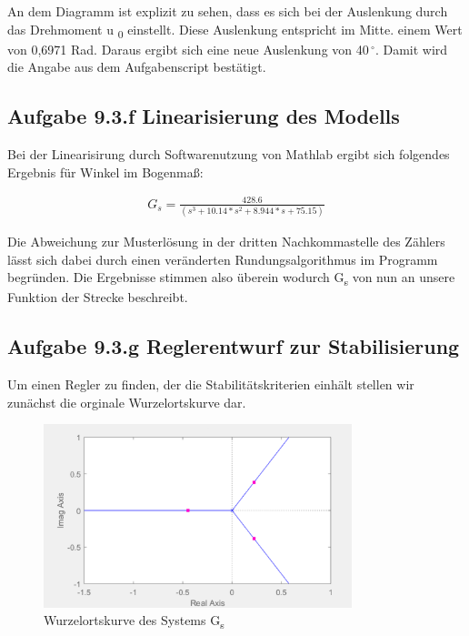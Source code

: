 \documentclass[10pt]{scrartcl}
\begin{document}
An dem Diagramm ist explizit zu sehen, dass es sich bei der Auslenkung durch das Drehmoment u \textsubscript{0} einstellt. Diese Auslenkung entspricht im Mitte. einem Wert von 0,6971 Rad. Daraus ergibt sich eine neue Auslenkung von 40\,$^\circ$. Damit wird die Angabe aus dem Aufgabenscript bestätigt.




\subsection{Aufgabe 9.3.f Linearisierung des Modells}

Bei der Linearisirung durch Softwarenutzung von Mathlab ergibt sich folgendes Ergebnis für Winkel im Bogenmaß:

\begin{align}
   G_s = \frac{428.6}{(s^3 + 10.14*s^2 + 8.944*s + 75.15)} 
\end{align}

Die Abweichung zur Musterlösung in der dritten Nachkommastelle des Zählers lässt sich dabei durch einen veränderten Rundungsalgorithmus im Programm begründen. 
Die Ergebnisse stimmen also überein wodurch G\textsubscript{s} von nun an unsere Funktion der Strecke beschreibt.




\subsection{Aufgabe 9.3.g Reglerentwurf zur Stabilisierung}

Um einen Regler zu finden, der die Stabilitätskriterien einhält stellen wir zunächst die orginale Wurzelortskurve dar.

\begin{figure}[H]
	\centering
	\includegraphics[width=0.8\textwidth]{WOZ9f}
	\caption{Wurzelortskurve des Systems G\textsubscript{s}}
	\label{img:grafik-dummy}
\end{figure}
\end{document}
